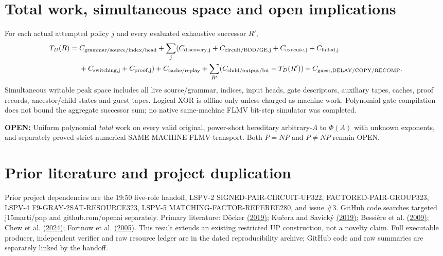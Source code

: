 \documentclass[11pt]{article}
\begin{document}
\section{Total work, simultaneous space and open implications}
For each actual attempted policy $j$ and every evaluated exhaustive successor $R'$,
\begin{align*}
T_D(R)={}&C_{\rm grammar/source/index/head}+\sum_j(C_{\rm discovery,j}+C_{\rm circuit/BDD/GE,j}
+C_{\rm execute,j}+C_{\rm failed,j}\\
&+C_{\rm switching,j}+C_{\rm proof,j})+C_{\rm cache/replay}
+\sum_{R'}(C_{\rm child/output/bit}+T_D(R'))
+C_{\rm guest,DELAY/COPY/RECOMP}.
\end{align*}
Simultaneous writable peak space includes all live source/grammar, indices, input heads, gate descriptors, auxiliary tapes, caches, proof records, ancestor/child states and guest tapes. Logical XOR is offline only unless charged as machine work. Polynomial gate compilation does not bound the aggregate successor sum; no native same-machine FLMV bit-step simulator was completed.

\noindent\textbf{OPEN:} Uniform polynomial \emph{total} work on every valid original, power-short hereditary arbitrary-$A$ to $\Phi(A)$ with unknown exponents, and separately proved strict numerical SAME-MACHINE FLMV transport. Both $P=NP$ and $P\ne NP$ remain OPEN.

\section{Prior literature and project duplication}
Prior project dependencies are the 19:50 five-role handoff, LSPV-2 SIGNED-PAIR-CIRCUIT-UP322, FACTORED-PAIR-GROUP323, LSPV-4 F9-GRAY-2SAT-RESOURCE323, LSPV-5 MATCHING-FACTOR-REFEREE280, and issue \#3. GitHub code searches targeted j15marti/pnp and github.com/openai separately. Primary literature: D\"ocker \href{https://arxiv.org/abs/1912.08032}{(2019)}; Ku\v{c}era and Savick\'y \href{https://arxiv.org/abs/1909.06673}{(2019)}; Bessi\`ere et al. \href{https://ijcai.org/proceedings/2009/76}{(2009)}; Chew et al. \href{https://doi.org/10.1609/aaai.v38i8.28635}{(2024)}; Fortnow et al. \href{https://doi.org/10.1145/1101821.1101822}{(2005)}. This result extends an existing restricted UP construction, not a novelty claim. Full executable producer, independent verifier and raw resource ledger are in the dated reproducibility archive; GitHub code and raw summaries are separately linked by the handoff.
\end{document}

